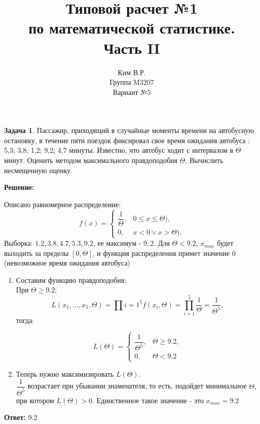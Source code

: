 \documentclass[a4paper,11pt]{article}
\title{Типовой расчет №1 \\ по математической статистике. \\ Часть II}
\author{Ким В.Р. \\ Группа M3207 \\ Вариант №5}
\date{}
\theoremstyle{definition}
\newtheorem{problem}{Задача}\setlength{\parindent}{0pt}
\newenvironment{solution}
{\begin{shaded}\textbf{Решение:}\par\setlength{\parindent}{0pt}}
{\end{shaded}}
\newenvironment{answer}
{\par\noindent\textbf{Ответ:}}
{\par}
\begin{document}
\maketitle

\begin{problem}
    Пассажир, приходящий в случайные моменты времени на автобусную остановку, в течение
    пяти поездок фиксировал свое время ожидания автобуса : 5,3; 3,8; 1,2; 9,2; 4,7 минуты.
    Известно, что автобус ходит с интервалом в \( \Theta \) минут. Оценить методом максимального
    правдоподобия \( \Theta \). Вычислить несмещенную оценку.

    \begin{solution}
        Описано равномерное распределение:
        \begin{equation}
            f(x) = 
            \begin{cases}
                \dfrac{1}{\Theta}, & 0 \leq x \leq \Theta), \\
                0,                 & x < 0 \lor x > \Theta).
            \end{cases}
        \end{equation}
        Выборка: \( 1.2, 3.8, 4.7, 5.3, 9.2 \), ее максимум - \(9,2\). 
        Для \(\Theta < 9.2\), \(x_{max}\) будет выходить за пределы \( [0,\Theta] \), 
        и функция распределения примет значение 0 (невозможное время ожидания автобуса)\\

        \begin{enumerate}
            \item Составим функцию правдоподобия: \\
                При \(\Theta \geq 9.2\):
                \[ L(x_1, \dots, x_5, \Theta) = \prod{i=1}^5 f(x_i, \Theta) = \prod^5_{i=1} \frac{1}{\Theta} = \frac{1}{\Theta^5}, \] тогда:

                \begin{equation}
                    L(\Theta) = 
                    \begin{cases}
                        \dfrac{1}{\Theta^5}, & \Theta \geq 9.2, \\
                        0,                  & \Theta < 9.2
                    \end{cases}
                \end{equation}
            \item  Теперь нужно максимизировать \( L(\Theta)\).\\
                   \(\dfrac{1}{\Theta^5}\) возрастает при убывании знаменателя, то есть,
                   подойдет минимальное \(\Theta\), при котором \(L(\Theta) > 0\). 
                   Единственное такое значение - это \(x_{max} = 9.2\)
        \end{enumerate}
    \end{solution}

    \begin{answer}
        9.2
    \end{answer}

\end{problem}
\end{document}
